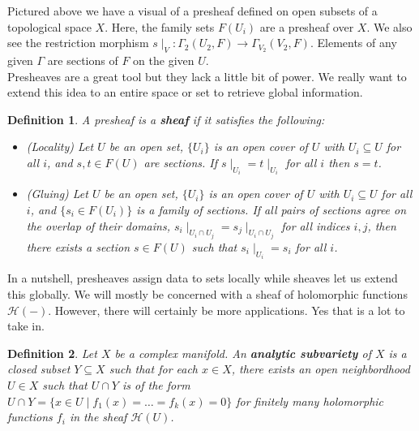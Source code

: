 \documentclass[12pt, letterpaper]{article}
\newtheorem{definition}{Definition}[section]
\newcommand{\ten}[1]{\textnormal{\textbf{#1}}}
\begin{document}
Pictured above we have a visual of a presheaf defined on open subsets of a topological
space $X$. Here, the family sets $F(U_i)$ are a presheaf over $X$. We also see the restriction
morphism $s\mid_V: \Gamma_2(U_2,F) \to \Gamma_{V_2}(V_2,F)$. Elements of any given
$\Gamma$ are sections of $F$ on the given $U$.\\

Presheaves are a great tool but they lack a little bit of power. We really want 
to extend this idea to an entire space or set to retrieve global information.

\begin{definition}
    A presheaf is a \ten{sheaf} if it satisfies the following:
    \begin{itemize}
        \item (Locality) Let $U$ be an open set, $\{U_i\}$ is an open cover of $U$
        with $U_i \subseteq U$ for all $i$, and $s,t \in F(U)$ are sections. If
        $s\mid_{U_i} = t \mid_{U_i}$ for all $i$ then $s=t$.
        \item (Gluing) Let $U$ be an open set, $\{U_i\}$ is an open cover of $U$
        with $U_i \subseteq U$ for all $i$, and $\{s_i \in F(U_i)\}$ is a family
        of sections. If all pairs of sections agree on the overlap of their domains,
        $s_i\mid_{U_i\cap U_j} = s_j\mid_{U_i\cap U_j}$ for all indices $i,j$, then
        there exists a section $s\in F(U)$ such that $s_i\mid_{U_i} = s_i$ for all $i$.
    \end{itemize}
\end{definition}

In a nutshell, presheaves assign data to sets locally while sheaves let us extend
this globally. We will mostly be concerned with a sheaf of holomorphic functions
$\mathcal{H}(-)$. However, there will certainly be more applications. Yes that is
a lot to take in.

\begin{definition}
    Let $X$ be a complex manifold. An \ten{analytic subvariety} of $X$ is a closed
    subset $Y \subseteq X$ such that for each $x \in X$, there exists an open neighbordhood
    $U \in X$ such that $U \cap Y$ is of the form 
    $U \cap Y = \{ x \in U \mid f_1(x) = \hdots = f_k(x) = 0\}$ for finitely many
    holomorphic functions $f_i$ in the sheaf $\mathcal{H}(U)$.
\end{definition}
\end{document}
